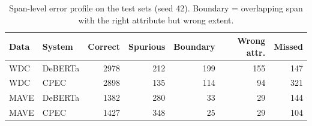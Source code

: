 \begin{table}[t]\centering\small
\begin{tabular}{llrrrrr}\toprule
Data & System & Correct & Spurious & Boundary & Wrong attr. & Missed \\\midrule
WDC & DeBERTa & 2978 & 212 & 199 & 155 & 147 \\
WDC & CPEC & 2898 & 135 & 114 & 94 & 321 \\
MAVE & DeBERTa & 1382 & 280 & 33 & 29 & 144 \\
MAVE & CPEC & 1427 & 348 & 25 & 29 & 104 \\
\bottomrule\end{tabular}
\caption{Span-level error profile on the test sets (seed 42). Boundary = overlapping span with the right attribute but wrong extent.}\label{tab:errors}\end{table}
